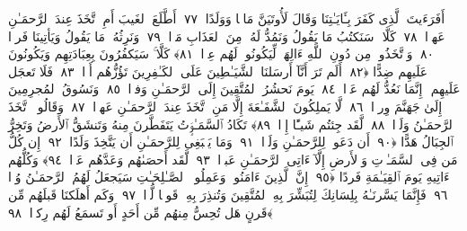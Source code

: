  أَفَرَءَيتَ ٱلَّذِى كَفَرَ بِـَٔايَـٰتِنَا وَقَالَ لَأُوتَيَنَّ مَالًۭا وَوَلَدًا ﴿٧٧﴾
 أَطَّلَعَ ٱلغَيبَ أَمِ ٱتَّخَذَ عِندَ ٱلرَّحمَـٰنِ عَهدًۭا ﴿٧٨﴾
 كَلَّا ۚ سَنَكتُبُ مَا يَقُولُ وَنَمُدُّ لَهُۥ مِنَ ٱلعَذَابِ مَدًّۭا ﴿٧٩﴾
 وَنَرِثُهُۥ مَا يَقُولُ وَيَأتِينَا فَردًۭا ﴿٨٠﴾
 وَٱتَّخَذُوا۟ مِن دُونِ ٱللَّهِ ءَالِهَةًۭ لِّيَكُونُوا۟ لَهُم عِزًّۭا ﴿٨١﴾
 كَلَّا ۚ سَيَكفُرُونَ بِعِبَادَتِهِم وَيَكُونُونَ عَلَيهِم ضِدًّا ﴿٨٢﴾
 أَلَم تَرَ أَنَّآ أَرسَلنَا ٱلشَّيَـٰطِينَ عَلَى ٱلكَـٰفِرِينَ تَؤُزُّهُم أَزًّۭا ﴿٨٣﴾
 فَلَا تَعجَل عَلَيهِم ۖ إِنَّمَا نَعُدُّ لَهُم عَدًّۭا ﴿٨٤﴾
 يَومَ نَحشُرُ ٱلمُتَّقِينَ إِلَى ٱلرَّحمَـٰنِ وَفدًۭا ﴿٨٥﴾
 وَنَسُوقُ ٱلمُجرِمِينَ إِلَىٰ جَهَنَّمَ وِردًۭا ﴿٨٦﴾
 لَّا يَملِكُونَ ٱلشَّفَـٰعَةَ إِلَّا مَنِ ٱتَّخَذَ عِندَ ٱلرَّحمَـٰنِ عَهدًۭا ﴿٨٧﴾
 وَقَالُوا۟ ٱتَّخَذَ ٱلرَّحمَـٰنُ وَلَدًۭا ﴿٨٨﴾
 لَّقَد جِئتُم شَيـًٔا إِدًّۭا ﴿٨٩﴾
 تَكَادُ ٱلسَّمَـٰوَٟتُ يَتَفَطَّرنَ مِنهُ وَتَنشَقُّ ٱلأَرضُ وَتَخِرُّ ٱلجِبَالُ هَدًّا ﴿٩٠﴾
 أَن دَعَوا۟ لِلرَّحمَـٰنِ وَلَدًۭا ﴿٩١﴾
 وَمَا يَنۢبَغِى لِلرَّحمَـٰنِ أَن يَتَّخِذَ وَلَدًا ﴿٩٢﴾
 إِن كُلُّ مَن فِى ٱلسَّمَـٰوَٟتِ وَٱلأَرضِ إِلَّآ ءَاتِى ٱلرَّحمَـٰنِ عَبدًۭا ﴿٩٣﴾
 لَّقَد أَحصَىٰهُم وَعَدَّهُم عَدًّۭا ﴿٩٤﴾
 وَكُلُّهُم ءَاتِيهِ يَومَ ٱلقِيَـٰمَةِ فَردًا ﴿٩٥﴾
 إِنَّ ٱلَّذِينَ ءَامَنُوا۟ وَعَمِلُوا۟ ٱلصَّـٰلِحَـٰتِ سَيَجعَلُ لَهُمُ ٱلرَّحمَـٰنُ وُدًّۭا ﴿٩٦﴾
 فَإِنَّمَا يَسَّرنَـٰهُ بِلِسَانِكَ لِتُبَشِّرَ بِهِ ٱلمُتَّقِينَ وَتُنذِرَ بِهِۦ قَومًۭا لُّدًّۭا ﴿٩٧﴾
 وَكَم أَهلَكنَا قَبلَهُم مِّن قَرنٍ هَل تُحِسُّ مِنهُم مِّن أَحَدٍ أَو تَسمَعُ لَهُم رِكزًۢا ﴿٩٨﴾
 
